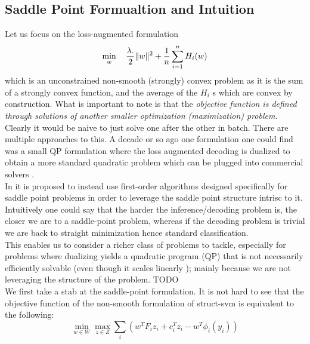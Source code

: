 \subsection{Saddle Point Formualtion and Intuition}
Let us focus on the loss-augmented formulation
\begin{equation}
  \min_{w} \quad \frac{\lambda .}{2} \lVert w\rVert^2+ \frac{1}{n}\sum_{i=1}^nH_i(w)
\end{equation}
which is an unconstrained non-smooth (strongly) convex problem
as it is the sum of a strongly convex function, and the average of
the $H_i$ s which are convex by construction.
What is important to note is that the \emph{objective function is defined
through solutions of another smaller optimization (maximization) problem.}
Clearly it would be naive to just solve one after the other in batch. There are
multiple approaches to this. A decade or so ago one formulation one could find
was a small QP formulation where the loss augmented decoding is dualized to
obtain a more standard quadratic problem which can be plugged into commercial
solvers \citep{taskarStructuredPredictionDual2006}.\\

In \citet{taskarStructuredPredictionDual2006} it is proposed to instead use
first-order algorithms designed specifically for saddle point problems in order
to leverage the saddle point structure intrisc to it. Intuitively one could say
that the harder the inference/decoding problem is, the closer we are to a
saddle-point problem, whereas if the decoding problem is trivial we are back to
straight minimization hence standard classification.\\

This enables us to consider a richer class of problems to tackle, especially for
problems where dualizing yields a quadratic program (QP) that is not necessarily
efficiently solvable (even though it scales linearly
\cite{taskarStructuredPredictionDual2006});
mainly because we are not leveraging the structure of the problem. TODO\\

We first take a stab at the saddle-point formulation. It is not hard
to see that the objective function of the non-smooth formulation of
struct-svm is equivalent to the following:
\begin{equation}
  \min_{ w \in {W}} \max_{ z \in {Z}} \sum_i \left( 
w^T  F_i  z_i +  c_i^T  z_i -  w^T  \phi _i( y_i)
\right)
  \label{saddle_point}
\end{equation}

